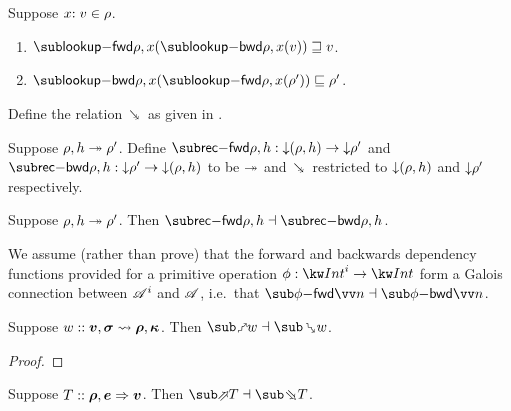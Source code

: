 \begin{lemma}
\label{lem:core-language:env-get-put}Suppose $x{:}\;v\in{\rho}$.
\begin{enumerate}
   \item \label{lem:core-language:env-get-put:1} $\envLookupFwdF{\rho,x}(\envLookupBwdF{\rho,x}(v)) \geq v$.
   \item \label{lem:core-language:env-get-put:2} $\envLookupBwdF{\rho,x}(\envLookupFwdF{\rho,x}(\rho')) \leq \rho'$.
\end{enumerate}
\end{lemma}

\begin{definition}
   \label{def:core-language:closeDefs-bwd}
   Define the relation $\closeDefsBwdR$ as given in .
\end{definition}

\begin{definition}
   Suppose $\rho, h \twoheadrightarrow \rho'$. Define $\closeDefsFwdF{\rho,h}: \Below{(\rho, h)} \to \Below{\rho'}$ and $\closeDefsBwdF{\rho,h}: \Below{\rho'} \to \Below{(\rho, h)}$ to be $\twoheadrightarrow$ and $\closeDefsBwdR$ restricted to ${\downarrow}{(\rho, h)}$ and ${\downarrow}{\rho'}$ respectively.
\end{definition}

\begin{theorem}
\label{thm:core-language:closeDefs:gc}
   Suppose $\rho, h \twoheadrightarrow \rho'$.  Then $\closeDefsFwdF{\rho,h} \adjoint \closeDefsBwdF{\rho,h}$.
\end{theorem}

We assume (rather than prove) that the forward and backwards dependency functions provided for a primitive operation $\phi: \tyInt^i \to \tyInt$ form a Galois connection between $\mathscr{A}^i$ and $\mathscr{A}$, i.e.~that $\primFwdBool{\phi}{\vec{n}} \adjoint \primBwdBool{\phi}{\vec{n}}$.

\begin{theorem}
   \label{thm:core-language:match:gc}
      Suppose $w :: \bm{v}, \bm{\sigma} \rightsquigarrow \bm{\rho}, \bm{\kappa}$.  Then $\matchFwdF{w} \adjoint \matchBwdF{w}$.
\end{theorem}

\ifappendices
   \begin{proof}
   \end{proof}
\fi

\begin{theorem}
\label{thm:core-language:eval:gc}
   Suppose $T :: \bm{\rho}, \bm{e} \Rightarrow \bm{v}$.  Then $\evalFwdF{T} \adjoint \evalBwdF{T}$.
\end{theorem}
